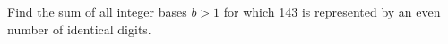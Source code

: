 Find the sum of all integer bases $b>1$ for which 143 is represented by an even number of identical digits.
